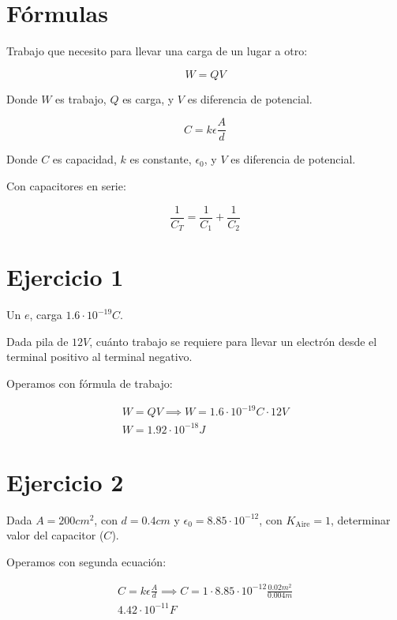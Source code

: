 \section*{Fórmulas}

Trabajo que necesito para llevar una carga de un lugar a otro:

\begin{equation}
    W = QV
\end{equation}

Donde \(W\) es trabajo,
\(Q\) es carga,
y \(V\) es diferencia de potencial.

\begin{equation}
    C=k\epsilon\frac{A}{d}
\end{equation}

Donde \(C\) es capacidad,
\(k\) es constante,
\(\epsilon_0\),
y \(V\) es diferencia de potencial.

Con capacitores en serie:

\begin{equation}
    \frac{1}{C_T} = \frac{1}{C_1} + \frac{1}{C_2}
\end{equation}

\section{Ejercicio 1}

Un \(e\), carga \(1.6 \cdot 10^{-19}C\).

Dada pila de \(12 V\),
cuánto trabajo se requiere para llevar un electrón desde el terminal positivo al terminal negativo.

Operamos con fórmula de trabajo:

\begin{align*}
    W = QV \implies W = 1.6 \cdot 10^{-19}C \cdot 12 V \\
    \boxed{W = 1.92 \cdot 10^{-18} J}
\end{align*}

\section{Ejercicio 2}

Dada \(A = 200 cm^2\), con \(d = 0.4 cm\) y \(\epsilon_0 = 8.85\cdot10^{-12}\),
con \(K_{\text{Aire}} = 1\), determinar valor del capacitor (\(C\)).

Operamos con segunda ecuación:

\begin{align*}
    C=k\epsilon\frac{A}{d} \implies C = 1 \cdot 8.85\cdot10^{-12} \frac{0.02 m^2}{0.004 m} \\
    \boxed{4.42 \cdot 10^{-11} F}
\end{align*}

